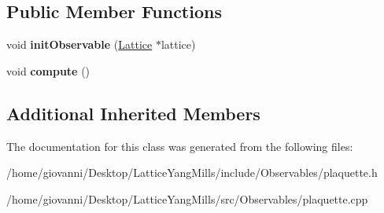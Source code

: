 \subsection*{Public Member Functions}
\begin{DoxyCompactItemize}
\item 
void {\bfseries init\+Observable} (\hyperlink{classLattice}{Lattice} $\ast$lattice)\hypertarget{classPlaquette_a736815cd93211ae6762d26f3694a88d5}{}\label{classPlaquette_a736815cd93211ae6762d26f3694a88d5}

\item 
void {\bfseries compute} ()\hypertarget{classPlaquette_a4f5cd3222dc5ecec563ff873507493ea}{}\label{classPlaquette_a4f5cd3222dc5ecec563ff873507493ea}

\end{DoxyCompactItemize}
\subsection*{Additional Inherited Members}


The documentation for this class was generated from the following files\+:\begin{DoxyCompactItemize}
\item 
/home/giovanni/\+Desktop/\+Lattice\+Yang\+Mills/include/\+Observables/plaquette.\+h\item 
/home/giovanni/\+Desktop/\+Lattice\+Yang\+Mills/src/\+Observables/plaquette.\+cpp\end{DoxyCompactItemize}
